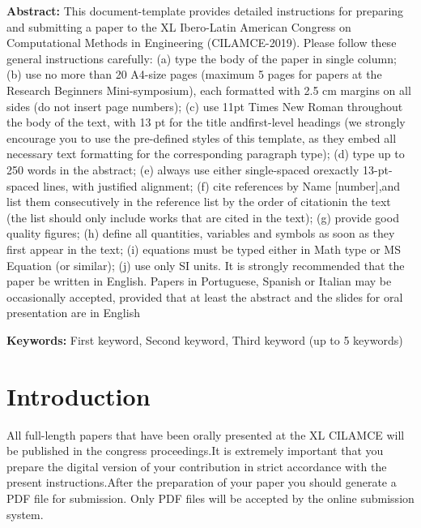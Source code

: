 \documentclass{cilamce19}
\begin{document}
\begin{titlepage}
\noindent %
\textbf{Abstract:} This document-template provides detailed instructions for preparing and submitting a paper to the XL Ibero-Latin American Congress on Computational Methods in Engineering (CILAMCE-2019). Please follow these general instructions carefully: (a) type the body of the paper in single column; (b) use no more than 20 A4-size pages (maximum 5 pages for papers at the Research Beginners Mini-symposium), each formatted with 2.5 cm margins on all sides (do not insert page numbers); (c) use 11pt Times New Roman throughout the body of the text, with 13 pt for the title andfirst-level headings (we strongly encourage you to use the pre-defined styles of this template, as they embed all necessary text formatting for the corresponding paragraph type); (d) type up to 250 words in the abstract; (e) always use either single-spaced orexactly 13-pt-spaced lines, with justified alignment; (f) cite references by Name [number],and list them consecutively in the reference list by the order of citationin the text (the list should only include works that are cited in the text); (g) provide good quality figures; (h) define all quantities, variables and symbols as soon as they first appear in the text; (i) equations must be typed either in Math type or MS Equation (or similar); (j) use only SI units. It is strongly recommended that the paper be written in English. Papers in Portuguese, Spanish or Italian may be occasionally accepted, provided that at least the abstract and the slides for oral presentation are in English

\noindent %
\textbf{Keywords:} First keyword, Second keyword, Third keyword (up to 5 keywords) 

\end{titlepage}




\section{Introduction}
   All full-length papers that have been orally presented at the XL CILAMCE will be published in the congress proceedings.It is extremely important that you prepare the digital version of your contribution in strict accordance with the present instructions.After the preparation of your paper you should generate a PDF file for submission. Only PDF files will be accepted by the online submission system.
   
\end{document}

